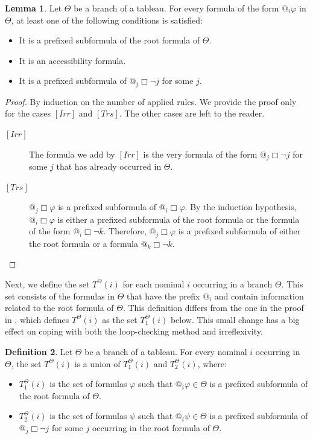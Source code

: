 \documentclass{article}
\theoremstyle{definition}
\newtheorem{definition}{Definition}[section]
\newtheorem{lemma}[definition]{Lemma}
\newcommand{\irr}{\mathit{Irr}}
\newcommand{\trans}{\mathit{Trs}}
\begin{document}
\begin{lemma}
  Let $\Theta$ be a branch of a tableau. For every formula of the form $@_i \varphi$ in $\Theta$, at least one of the following conditions is satisfied:
  \begin{itemize}
      \item It is a prefixed subformula of the root formula of $\Theta$.
      \item It is an accessibility formula.
      \item It is a prefixed subformula of $@_j \Box \neg j$ for some $j$.
  \end{itemize}
  \label{lemquasi}
\end{lemma}
\begin{proof}
    By induction on the number of applied rules. We provide the proof only for the cases $[\irr]$ and $[\trans]$. The other cases are left to the reader.
    \begin{description}
        \item[{$[\irr]$}] The formula we add by $[\irr]$ is the very formula of the form $@_j \Box \neg j$ for some $j$ that has already occurred in $\Theta$.
        \item[{$[\trans]$}] $@_j \Box \varphi$ is a prefixed subformula of $@_i \Box \varphi$. By the induction hypothesis, $@_i \Box \varphi$ is either a prefixed subformula of the root formula or the formula of the form $@_i \Box \neg k$. Therefore, $@_j \Box \varphi$ is a prefixed subformula of either the root formula or a formula $@_k \Box \neg k$. \qedhere
    \end{description}
\end{proof}

Next, we define the set $T^\Theta(i)$ for each nominal $i$ occurring in a branch $\Theta$. This set consists of the formulas in $\Theta$ that have the prefix $@_i$ and contain information related to the root formula of $\Theta$. This definition differs from the one in the proof in \cite{bolander2007}, which defines $T^\Theta(i)$ as the set $T_1^\Theta(i)$ below. This small change has a big effect on coping with both the loop-checking method and irreflexivity.


\begin{definition}
  Let $\Theta$ be a branch of a tableau. For every nominal $i$ occurring in $\Theta$, the set $T^\Theta(i)$ is a union of $T_1^\Theta(i)$ and $T_2^\Theta(i)$, where:
  \begin{itemize}
      \item $T_1^\Theta(i)$ is the set of formulas $\varphi$ such that $@_i \varphi \in \Theta$ is a prefixed subformula of the root formula of $\Theta$.
      \item $T_2^\Theta(i)$ is the set of formulas $\psi$ such that $@_i \psi \in \Theta$ is a prefixed subformula of $@_j \Box \neg j$ for some $j$ occurring in the root formula of $\Theta$.
  \end{itemize}
  \label{defT}
\end{definition}
\end{document}
